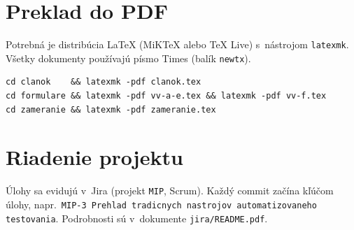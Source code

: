 \documentclass[11pt,a4paper]{article}
\begin{document}
\section*{Preklad do PDF}

Potrebná je distribúcia LaTeX (MiKTeX alebo TeX Live) s~nástrojom \texttt{latexmk}. Všetky dokumenty používajú písmo Times (balík \texttt{newtx}).

\begin{verbatim}
cd clanok    && latexmk -pdf clanok.tex
cd formulare && latexmk -pdf vv-a-e.tex && latexmk -pdf vv-f.tex
cd zameranie && latexmk -pdf zameranie.tex
\end{verbatim}

\section*{Riadenie projektu}

Úlohy sa evidujú v~Jira (projekt \texttt{MIP}, Scrum). Každý commit začína kľúčom úlohy, napr.\ \texttt{MIP-3 Prehlad tradicnych nastrojov automatizovaneho testovania}. Podrobnosti sú v~dokumente \texttt{jira/README.pdf}.
\end{document}
